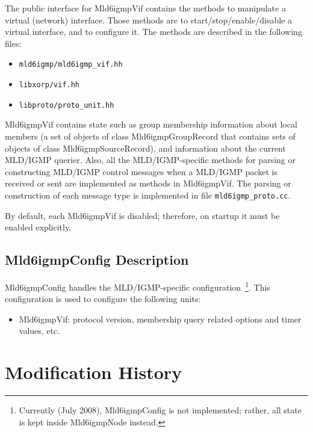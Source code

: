 \documentclass[11pt]{article}
\begin{document}
The public interface for Mld6igmpVif contains the methods to manipulate a
virtual (network) interface. Those methods are to start/stop/enable/disable a
virtual interface, and to configure it. The methods are described in
the following files:

\begin{itemize}
  \item \verb=mld6igmp/mld6igmp_vif.hh=
  \item \verb=libxorp/vif.hh=
  \item \verb=libproto/proto_unit.hh=
\end{itemize}

Mld6igmpVif contains state such as group membership information about
local members (a set of objects of class Mld6igmpGroupRecord that contains
sets of objects of class Mld6igmpSourceRecord), and information
about the current MLD/IGMP querier. Also, all 
the MLD/IGMP-specific methods for parsing or constructing MLD/IGMP control
messages when a MLD/IGMP packet is received or sent are implemented as
methods in Mld6igmpVif. The parsing or construction of each message type is
implemented in file \verb=mld6igmp_proto.cc=.

By default, each Mld6igmpVif is disabled; therefore, on startup it must
be enabled explicitly.


\subsection{Mld6igmpConfig Description}

Mld6igmpConfig handles the MLD/IGMP-specific
configuration~\footnote{Currently (July 2008), Mld6igmpConfig is not
implemented; rather, all state is kept inside Mld6igmpNode instead.}. This
configuration is used to configure the following units:

\begin{itemize}

  \item Mld6igmpVif: protocol version, membership query related options
  and timer values, etc.

\end{itemize}


\appendix
\section{Modification History}
\end{document}
